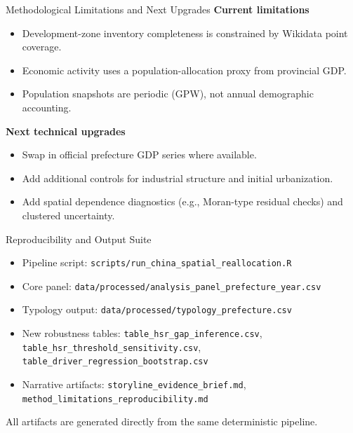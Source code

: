\documentclass[aspectratio=169]{beamer}
\begin{document}
\begin{frame}{Methodological Limitations and Next Upgrades}
\small
\textbf{Current limitations}
\begin{itemize}
  \item Development-zone inventory completeness is constrained by Wikidata point coverage.
  \item Economic activity uses a population-allocation proxy from provincial GDP.
  \item Population snapshots are periodic (GPW), not annual demographic accounting.
\end{itemize}
\textbf{Next technical upgrades}
\begin{itemize}
  \item Swap in official prefecture GDP series where available.
  \item Add additional controls for industrial structure and initial urbanization.
  \item Add spatial dependence diagnostics (e.g., Moran-type residual checks) and clustered uncertainty.
\end{itemize}
\end{frame}

\begin{frame}{Reproducibility and Output Suite}
\small
\begin{itemize}
  \item Pipeline script: \texttt{scripts/run\_china\_spatial\_reallocation.R}
  \item Core panel: \texttt{data/processed/analysis\_panel\_prefecture\_year.csv}
  \item Typology output: \texttt{data/processed/typology\_prefecture.csv}
  \item New robustness tables: \texttt{table\_hsr\_gap\_inference.csv}, \texttt{table\_hsr\_threshold\_sensitivity.csv}, \texttt{table\_driver\_regression\_bootstrap.csv}
  \item Narrative artifacts: \texttt{storyline\_evidence\_brief.md}, \texttt{method\_limitations\_reproducibility.md}
\end{itemize}
All artifacts are generated directly from the same deterministic pipeline.
\end{frame}
\end{document}
